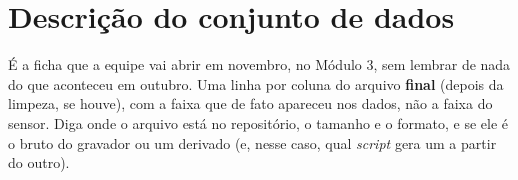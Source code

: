 \section{Descrição do conjunto de dados}
\label{sec:dataset}
\rubricaRobustez

\begin{orientacao}
É a ficha que a equipe vai abrir em novembro, no Módulo 3, sem lembrar
de nada do que aconteceu em outubro. Uma linha por coluna do arquivo
\textbf{final} (depois da limpeza, se houve), com a faixa que de fato
apareceu nos dados, não a faixa do sensor. Diga onde o arquivo está no
repositório, o tamanho e o formato, e se ele é o bruto do gravador ou um
derivado (e, nesse caso, qual \emph{script} gera um a partir do outro).
\end{orientacao}

